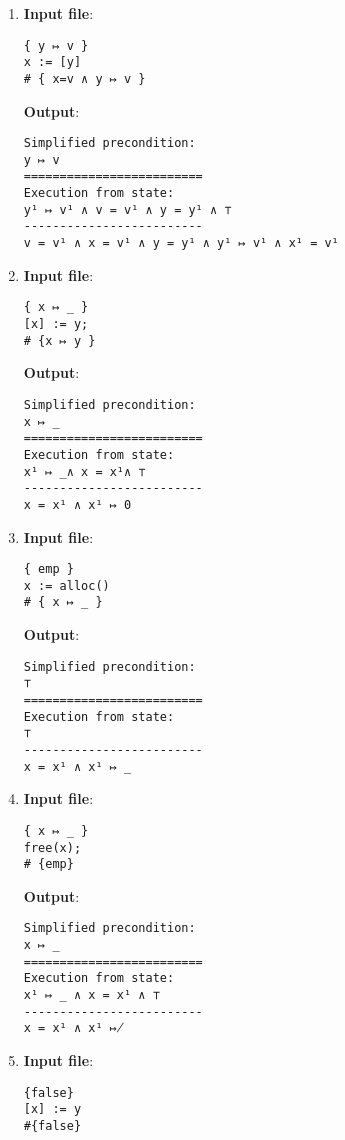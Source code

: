 \documentclass[parskip=half]{scrartcl}
\begin{document}
\begin{enumerate}

\item \textbf{Input file}: 
\begin{verbatim}
{ y ↦ v }
x := [y]
# { x=v ∧ y ↦ v }
\end{verbatim}

\textbf{Output}: 
\begin{verbatim}
Simplified precondition:
y ↦ v
=========================
Execution from state:
y¹ ↦ v¹ ∧ v = v¹ ∧ y = y¹ ∧ ⊤
-------------------------
v = v¹ ∧ x = v¹ ∧ y = y¹ ∧ y¹ ↦ v¹ ∧ x¹ = v¹
\end{verbatim}

\item 
\textbf{Input file}: 
\begin{verbatim}
{ x ↦ _ }
[x] := y; 
# {x ↦ y }
\end{verbatim}

\textbf{Output}: 
\begin{verbatim}
Simplified precondition:
x ↦ _
=========================
Execution from state:
x¹ ↦ _∧ x = x¹∧ ⊤
-------------------------
x = x¹ ∧ x¹ ↦ 0
\end{verbatim}

\item 
\textbf{Input file}: 
\begin{verbatim}
{ emp }
x := alloc()
# { x ↦ _ } 
\end{verbatim}

\textbf{Output}: 
\begin{verbatim}
Simplified precondition:
⊤
=========================
Execution from state:
⊤
-------------------------
x = x¹ ∧ x¹ ↦ _
\end{verbatim}

\item 
\textbf{Input file}: 
\begin{verbatim}
{ x ↦ _ }
free(x); 
# {emp}
\end{verbatim}

\textbf{Output}: 
\begin{verbatim}
Simplified precondition:
x ↦ _
=========================
Execution from state:
x¹ ↦ _ ∧ x = x¹ ∧ ⊤
-------------------------
x = x¹ ∧ x¹ ↦̸
\end{verbatim}

\item 
\textbf{Input file}: 
\begin{verbatim}
{false}
[x] := y   
#{false}
\end{verbatim}


\end{enumerate}
\end{document}
